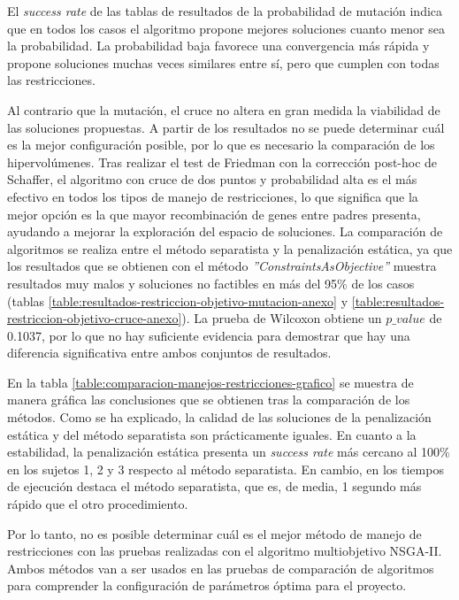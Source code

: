 El \textit{success rate} de las tablas de resultados de la probabilidad de mutación indica que en todos los casos el algoritmo propone mejores soluciones cuanto menor sea la probabilidad. La probabilidad baja favorece una convergencia más rápida y propone soluciones muchas veces similares entre sí, pero que cumplen con todas las restricciones.

Al contrario que la mutación, el cruce no altera en gran medida la viabilidad de las soluciones propuestas. A partir de los resultados no se puede determinar cuál es la mejor configuración posible, por lo que es necesario la comparación de los hipervolúmenes. Tras realizar el test de Friedman con la corrección post-hoc de Schaffer, el algoritmo con cruce de dos puntos y probabilidad alta es el más efectivo en todos los tipos de manejo de restricciones, lo que significa que la mejor opción es la que mayor recombinación de genes entre padres presenta, ayudando a mejorar la exploración del espacio de soluciones.
\newpage
La comparación de algoritmos se realiza entre el método separatista y la penalización estática, ya que los resultados que se obtienen con el método \textit{''ConstraintsAsObjective''} muestra resultados muy malos y soluciones no factibles en más del 95\% de los casos (tablas \ref{table:resultados-restriccion-objetivo-mutacion-anexo} y \ref{table:resultados-restriccion-objetivo-cruce-anexo}). La prueba de Wilcoxon obtiene un \textit{$p\_value$} de 0.1037, por lo que no hay suficiente evidencia para demostrar que hay una diferencia significativa entre ambos conjuntos de resultados.

En la tabla \ref{table:comparacion-manejos-restricciones-grafico} se muestra de manera gráfica las conclusiones que se obtienen tras la comparación de los métodos. Como se ha explicado, la calidad de las soluciones de la penalización estática y del método separatista son prácticamente iguales. En cuanto a la estabilidad, la penalización estática presenta un \textit{success rate} más cercano al 100\% en los sujetos 1, 2 y 3 respecto al método separatista. En cambio, en los tiempos de ejecución destaca el método separatista, que es, de media, 1 segundo más rápido que el otro procedimiento.

Por lo tanto, no es posible determinar cuál es el mejor método de manejo de restricciones con las pruebas realizadas con el algoritmo multiobjetivo NSGA-II. Ambos métodos van a ser usados en las pruebas de comparación de algoritmos para comprender la configuración de parámetros óptima para el proyecto.

